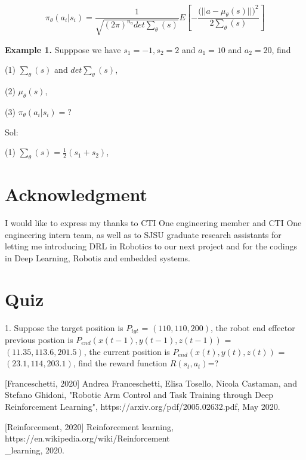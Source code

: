 \documentclass[conference]{IEEEtran}
\begin{document}
\begin{equation}
\pi_{\theta} ( a_i | s_i ) = 
\frac{ 1} { \sqrt{ (2 \pi)^{n_a} det \sum_{\theta}(s) } }   
E [ - \frac{ ( {||a - \mu_{\theta}(s)|| )^2} } { 2  \sum_{\theta}(s)} ]
\end{equation} 

\textbf{Example 1.}  
Supppose we have $s_1 = -1, s_2 = 2$
and $a_1 = 10$ and $a_2 = 20$, 
find

(1) $\sum_{\theta}(s)$ and $det \sum_{\theta}(s)$, 

(2) $ \mu_{\theta}(s)$, 

(3) $\pi_{\theta} ( a_i | s_i ) =?$ 

Sol: 

(1) $\sum_{\theta}(s) = \frac{1} {2}  (s_1 + s_2) $, 
 
\section*{Acknowledgment}

I would like to express my thanks to CTI One engineering member and 
CTI One engineering intern team, as well as to SJSU graduate research assistants 
for letting me introducing DRL in Robotics to our next project and for the 
codings in Deep Learning, Robotis and embedded systems. 

\section{Quiz}

1. Suppose the target position is $P_{tgt}$ = $(110,110,200)$, 
the robot end effector previous postion is 
$P_{end}(x(t-1),y(t-1),z(t-1))$ = $(11.35, 113.6, 201.5)$, 
the current position
is $P_{end}(x(t),y(t),z(t))$ =$(23.1,114,203.1)$, 
find the reward function $R(s_t,a_t)$=? 


\begin{thebibliography}{1}
[Franceschetti, 2020] 
Andrea Franceschetti, Elisa Tosello, Nicola Castaman, and Stefano
Ghidoni, 
"Robotic Arm Control and Task Training
through Deep Reinforcement Learning", 
https://arxiv.org/pdf/2005.02632.pdf, May 2020. 

[Reinforcement, 2020] 
Reinforcement learning, 
https://en.wikipedia.org/wiki/Reinforcement \\ \_learning, 2020. 

\end{thebibliography}
\end{document}
